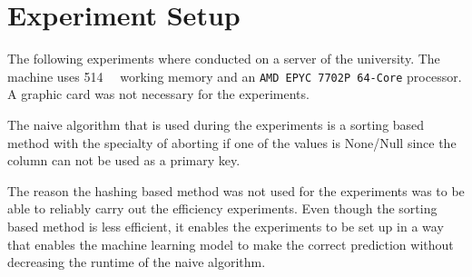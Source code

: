 \section{Experiment Setup}\label{sec:experiment-setup}
The following experiments where conducted on a server of the university. The machine uses \SI{514}{\gibi\byte} working memory and an \texttt{AMD EPYC 7702P 64-Core} processor. A graphic card was not necessary for the experiments.

The naive algorithm that is used during the experiments is a sorting based method with the specialty of aborting if one of the values is None/Null since the column can not be used as a primary key.

The reason the hashing based method was not used for the experiments was to be able to reliably carry out the efficiency experiments. Even though the sorting based method is less efficient, it enables the experiments to be set up in a way that enables the machine learning model to make the correct prediction without decreasing the runtime of the naive algorithm.


